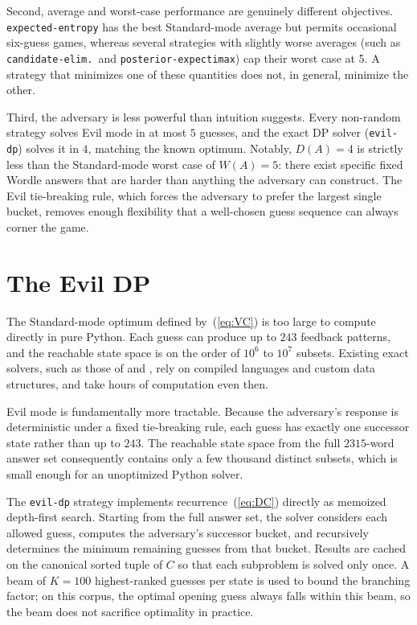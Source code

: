 \documentclass[11pt]{article}
\begin{document}
Second, average and worst-case performance are genuinely different
objectives. \texttt{expected-entropy} has the best Standard-mode
average but permits occasional six-guess games, whereas several
strategies with slightly worse averages (such as
\texttt{candidate-elim.}\ and \texttt{posterior-expectimax}) cap their
worst case at 5. A strategy that minimizes one of these quantities
does not, in general, minimize the other.

Third, the adversary is less powerful than intuition suggests. Every
non-random strategy solves Evil mode in at most $5$ guesses, and the
exact DP solver (\texttt{evil-dp}) solves it in $4$, matching the
known optimum. Notably, $D(A) = 4$ is strictly less than the
Standard-mode worst case of $W(A) = 5$: there exist specific fixed
Wordle answers that are harder than anything the adversary can
construct. The Evil tie-breaking rule, which forces the adversary to
prefer the largest single bucket, removes enough flexibility that a
well-chosen guess sequence can always corner the game.

\section*{The Evil DP}

The Standard-mode optimum defined by~(\ref{eq:VC}) is too large to
compute directly in pure Python. Each guess can produce up to $243$
feedback patterns, and the reachable state space is on the order of
$10^6$ to $10^7$ subsets. Existing exact solvers, such as those of
\citet{bertsimas2022wordle} and \citet{selby2022wordle}, rely on
compiled languages and custom data structures, and take hours of
computation even then.

Evil mode is fundamentally more tractable. Because the adversary's
response is deterministic under a fixed tie-breaking rule, each guess
has exactly one successor state rather than up to $243$. The reachable
state space from the full $\num{2315}$-word answer set consequently
contains only a few thousand distinct subsets, which is small enough
for an unoptimized Python solver.

The \texttt{evil-dp} strategy implements recurrence~(\ref{eq:DC})
directly as memoized depth-first search. Starting from the full
answer set, the solver considers each allowed guess, computes the
adversary's successor bucket, and recursively determines the minimum
remaining guesses from that bucket. Results are cached on the
canonical sorted tuple of $C$ so that each subproblem is solved only
once. A beam of $K=100$ highest-ranked guesses per state is used to
bound the branching factor; on this corpus, the optimal opening guess
always falls within this beam, so the beam does not sacrifice
optimality in practice.
\end{document}
